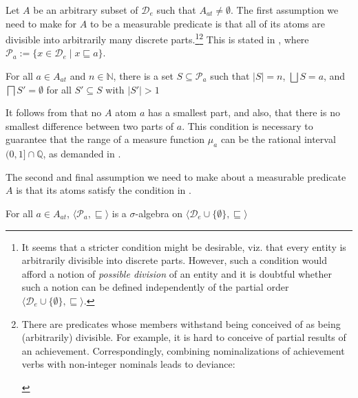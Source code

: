 \documentclass[output=paper]{langscibook}
\begin{document}
Let $A$ be an arbitrary subset of $\mathcal{D}_e$ such that $A_{at}\ne\emptyset$. The first assumption we need to make for $A$ to be a measurable predicate is that all of its atoms are divisible into arbitrarily many discrete parts.\footnote{It seems that a stricter condition might be desirable, viz. that every entity is arbitrarily divisible into discrete parts. However, such a condition would afford a notion of \textit{possible division} of an entity and it is doubtful whether such a notion can be defined independently of the partial order $\langle{\mathcal D}_e\cup\{\emptyset\},\sqsubseteq\rangle$.}\footnote{\label{hai-tri:fn:indivisible}There are predicates whose members withstand being conceived of as being (arbitrarily) divisible. For example, it is hard to conceive of partial results of an achievement. Correspondingly, combining nominalizations of achievement verbs with non-integer nominals leads to deviance:

\ea \label{hai-tri:ex:deviant}
\z
\z 
} This is stated in , where ${\mathcal P}_a := \{x\in{\mathcal D}_e\mid x\sqsubseteq a\}$.

\ea For all $a \in A_{at}$ and $n\in\mathbb{N}$, there is a set $S \subseteq {\mathcal P}_a$ such that $|S|=n$, $\bigsqcup S=a$, and $\bigsqcap S'=\emptyset$ for all $S'\subseteq S$ with $|S'|>1$
\label{hai-tri:divisible}
\z

\noindent  It follows from  that no $A$ atom $a$ has a smallest part, and also, that there is no smallest difference between two parts of $a$. This condition is necessary to guarantee that the range of a measure function $\mu_a$ can be the rational interval $(0,1]\cap\mathbb{Q}$, as demanded in .

The second and final assumption we need to make about a measurable predicate $A$ is that its atoms satisfy the condition in .

\ea \label{hai-tri:sigma-alg}
For all $a \in A_{at}$, $\langle{\mathcal P}_a,\sqsubseteq\rangle$ is a $\sigma$-algebra on $\langle{\mathcal D}_e\cup\{\emptyset\},\sqsubseteq\rangle$\footnotemark
\z
%
\end{document}
